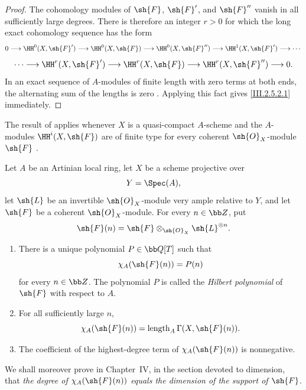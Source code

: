 \begin{proof}
The cohomology modules of $\sh{F}$, $\sh{F}'$, and $\sh{F}''$ vanish in all sufficiently large degrees.
There is therefore an integer $r>0$ for which the long exact cohomology sequence has the form
\[
  0\longrightarrow\HH^0(X,\sh{F}')
  \longrightarrow\HH^0(X,\sh{F})
  \longrightarrow\HH^0(X,\sh{F}'')
  \longrightarrow\HH^1(X,\sh{F}')
  \longrightarrow\cdots
\]
\[
  \cdots\longrightarrow\HH^r(X,\sh{F}')
  \longrightarrow\HH^r(X,\sh{F})
  \longrightarrow\HH^r(X,\sh{F}'')
  \longrightarrow0.
\]
In an exact sequence of $A$-modules of finite length with zero terms at both ends, the alternating sum of the lengths is zero .
Applying this fact gives \eqref{III.2.5.2.1} immediately.
\end{proof}

The result of  applies whenever $X$ is a quasi-compact $A$-scheme and the $A$-modules $\HH^i(X,\sh{F})$ are of finite type for every coherent $\sh{O}_X$-module $\sh{F}$ .

\begin{theorem}[2.5.3]
\label{III.2.5.3}
Let $A$ be an Artinian local ring, let $X$ be a scheme projective over
\[
  Y=\Spec(A),
\]
let $\sh{L}$ be an invertible $\sh{O}_X$-module very ample relative to $Y$, and let $\sh{F}$ be a coherent $\sh{O}_X$-module.
For every $n\in\bb Z$, put
\[
  \sh{F}(n)=\sh{F}\otimes_{\sh{O}_X}\sh{L}^{\otimes n}.
\]
\begin{enumerate}
  \item[(i)] There is a unique polynomial $P\in\bb Q[T]$ such that
  \[
    \chi_A(\sh{F}(n))=P(n)
  \]
  for every $n\in\bb Z$.
  The polynomial $P$ is called the \emph{Hilbert polynomial} of $\sh{F}$ with respect to $A$.

  \item[(ii)] For all sufficiently large $n$,
  \[
    \chi_A(\sh{F}(n))
    =
    \operatorname{length}_A\Gamma(X,\sh{F}(n)).
  \]

  \item[(iii)] The coefficient of the highest-degree term of $\chi_A(\sh{F}(n))$ is nonnegative.
\end{enumerate}
\end{theorem}

We shall moreover prove in Chapter~IV, in the section devoted to dimension, that \emph{the degree of $\chi_A(\sh{F}(n))$ equals the dimension of the support of $\sh{F}$}.

